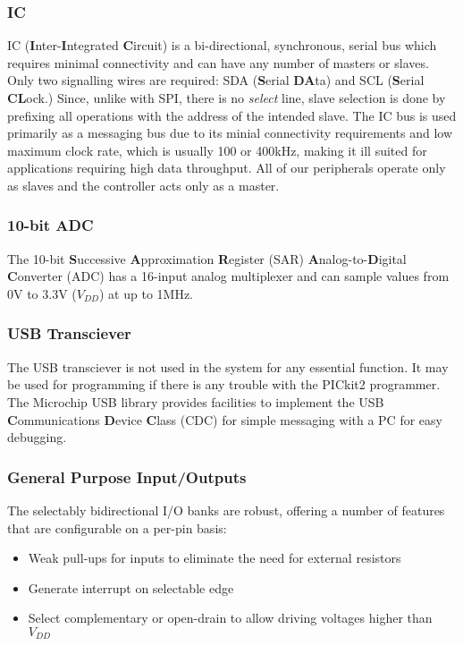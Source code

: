\subsubsection*{IC}
IC (\textbf{I}nter-\textbf{I}ntegrated \textbf{C}ircuit) is a bi-directional, synchronous, serial bus which requires minimal connectivity and can have any number of masters or slaves. Only two signalling wires are required: SDA (\textbf{S}erial \textbf{DA}ta) and SCL (\textbf{S}erial \textbf{CL}ock.) Since, unlike with SPI, there is no \textit{select} line, slave selection is done by prefixing all operations with the address of the intended slave. The IC bus is used primarily as a messaging bus due to its minial connectivity requirements and low maximum clock rate, which is usually 100 or 400kHz, making it ill suited for applications requiring high data throughput. All of our peripherals operate only as slaves and the controller acts only as a master.
\subsubsection{10-bit ADC}
The 10-bit \textbf{S}uccessive \textbf{A}pproximation \textbf{R}egister (SAR) \textbf{A}nalog-to-\textbf{D}igital \textbf{C}onverter (ADC) has a 16-input analog multiplexer and can sample values from 0V to 3.3V ($V_{DD}$) at up to 1MHz.
\subsubsection{USB Transciever}
The USB transciever is not used in the system for any essential function. It may be used for programming if there is any trouble with the PICkit2 programmer. The Microchip USB library provides facilities to implement the USB \textbf{C}ommunications \textbf{D}evice \textbf{C}lass (CDC) for simple messaging with a PC for easy debugging.
\subsubsection{General Purpose Input/Outputs}
The selectably bidirectional I/O banks are robust, offering a number of features that are configurable on a per-pin basis:
\begin{itemize}
\item Weak pull-ups for inputs to eliminate the need for external resistors
\item Generate interrupt on selectable edge
\item Select complementary or open-drain to allow driving voltages higher than $V_{DD}$
\end{itemize}

